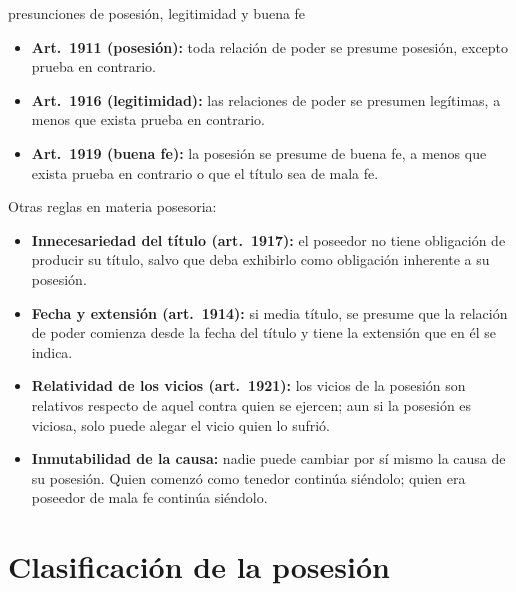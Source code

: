 \documentclass[12pt,oneside]{book}
\begin{document}
\begin{regla}{presunciones de posesión, legitimidad y buena fe}
\begin{itemize}
    \item \textbf{Art.~1911 (posesión):} toda relación de poder se presume posesión, excepto prueba en contrario.
    \item \textbf{Art.~1916 (legitimidad):} las relaciones de poder se presumen legítimas, a menos que exista prueba en contrario.
    \item \textbf{Art.~1919 (buena fe):} la posesión se presume de buena fe, a menos que exista prueba en contrario o que el título sea de mala fe.
\end{itemize}
\end{regla}

Otras reglas en materia posesoria:

\begin{itemize}
    \item \textbf{Innecesariedad del título (art.~1917):} el poseedor no tiene obligación de producir su título, salvo que deba exhibirlo como obligación inherente a su posesión.
    \item \textbf{Fecha y extensión (art.~1914):} si media título, se presume que la relación de poder comienza desde la fecha del título y tiene la extensión que en él se indica.
    \item \textbf{Relatividad de los vicios (art.~1921):} los vicios de la posesión son relativos respecto de aquel contra quien se ejercen; aun si la posesión es viciosa, solo puede alegar el vicio quien lo sufrió.
    \item \textbf{Inmutabilidad de la causa:} nadie puede cambiar por sí mismo la causa de su posesión. Quien comenzó como tenedor continúa siéndolo; quien era poseedor de mala fe continúa siéndolo.
\end{itemize}

\section{Clasificación de la posesión}
\end{document}
